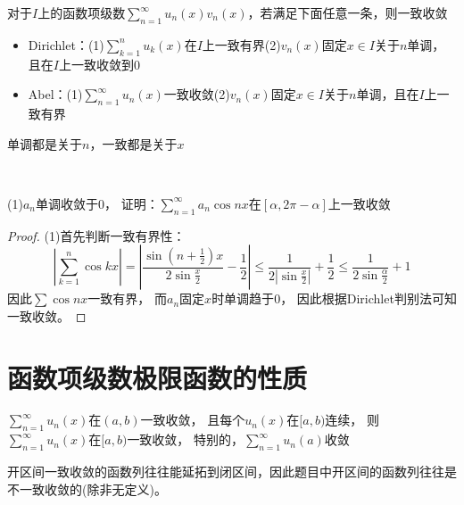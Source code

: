 \begin{theorem}[Dirichlet与Abel判别法]
  对于$I$上的函数项级数$\sum\limits_{n = 1}^{\infty}u_n(x)v_n(x)$，若满足下面任意一条，则一致收敛
  \begin{itemize}
  \item Dirichlet：(1)$\sum\limits_{k = 1}^nu_k(x)$在$I$上一致有界(2)$v_n(x)$固定$x \in I$关于$n$单调，且在$I$上一致收敛到$0$
  \item Abel：(1)$\sum\limits_{n = 1}^{\infty}u_n(x)$一致收敛(2)$v_n(x)$固定$x \in I$关于$n$单调，且在$I$上一致有界
  \end{itemize}
\end{theorem}

\begin{note}
  单调都是关于$n$，一致都是关于$x$
\end{note}

~

\begin{exercise}[经典一致收敛题]
  (1)$a_n$单调收敛于$0$，
  证明：$\sum\limits_{n = 1}^{\infty}a_n \cos nx$在$[\alpha, 2\pi - \alpha]$上一致收敛
\end{exercise}

\begin{proof}
  (1)首先判断一致有界性：
  \begin{equation*}
    \left| \sum\limits_{k = 1}^n \cos kx \right| = \left| \frac{\sin \left( n + \frac{1}{2} \right)x}{2 \sin \frac{x}{2}} - \frac{1}{2} \right| \leq \frac{1}{2 \left| \sin \frac{x}{2} \right|} + \frac{1}{2} \leq \frac{1}{2 \sin \frac{\alpha}{2}} + 1
  \end{equation*}
  因此$\sum \cos nx$一致有界，
  而$a_n$固定$x$时单调趋于$0$，
  因此根据Dirichlet判别法可知一致收敛。
\end{proof}


\section{函数项级数极限函数的性质}

\begin{theorem}[端点法]
  $\sum\limits_{n = 1}^{\infty}u_n(x)$在$(a,b)$一致收敛，
  且每个$u_n(x)$在$[a,b)$连续，
  则$\sum\limits_{n = 1}^{\infty}u_n(x)$在$[a,b)$一致收敛，
  特别的，$\sum\limits_{n = 1}^{\infty}u_n(a)$收敛
\end{theorem}

\begin{note}
  开区间一致收敛的函数列往往能延拓到闭区间，因此题目中开区间的函数列往往是不一致收敛的(除非无定义)。
\end{note}

